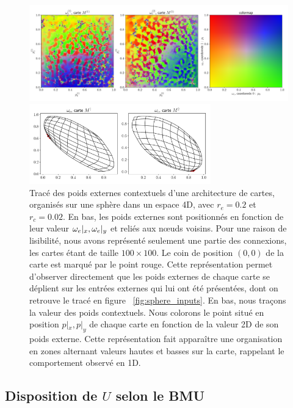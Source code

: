 \documentclass[../main]{subfiles}
\begin{document}
\begin{figure}[ht!]
	\begin{minipage}{\textwidth}
	\includegraphics[width=\textwidth]{wc_rc002_afterbug_nopoints.pdf}
	\end{minipage}
	\begin{minipage}{\textwidth}
		\includegraphics[width=0.7\textwidth]{we_rc002_afterbug_step10.pdf}
		\caption{Tracé des poids externes contextuels d'une architecture de cartes, organisés sur une sphère dans un espace 4D, avec $r_e =0.2$ et $r_c = 0.02$.
		En bas, les poids externes sont positionnés en fonction de leur valeur $\omega_e|_x, \omega_e|_y$ et reliés aux n\oe{}uds voisins. Pour une raison de lisibilité, nous avons représenté seulement une partie des connexions, les cartes étant de taille $100 \times 100$. Le coin de position $(0,0)$ de la carte est marqué par le point rouge. Cette représentation permet d'observer directement que les poids externes de chaque carte se déplient sur les entrées externes qui lui ont été présentées, dont on retrouve le tracé en figure ~\ref{fig:sphere_inputs}.
		En bas, nous traçons la valeur des poids contextuels. Nous colorons le point situé en position $p|_x, p|_y$ de chaque carte en fonction de la valeur 2D de son poids externe. Cette représentation fait apparaître une organisation en zones alternant valeurs hautes et basses sur la carte, rappelant le comportement observé en 1D.
		\label{fig:2som_s_002_wc}}
		\end{minipage}
\end{figure}

\subsection{Disposition de $U$ selon le BMU \label{par:U_bmu2D}}
\end{document}
